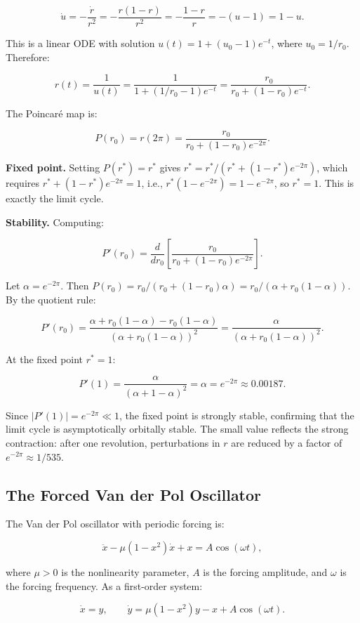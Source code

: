 \[
\dot{u} = -\frac{\dot{r}}{r^2} = -\frac{r(1-r)}{r^2} = -\frac{1-r}{r} = -(u - 1) = 1 - u.
\]

This is a linear ODE with solution $u(t) = 1 + (u_0 - 1)e^{-t}$, where $u_0 = 1/r_0$. Therefore:

\[
r(t) = \frac{1}{u(t)} = \frac{1}{1 + (1/r_0 - 1)e^{-t}} = \frac{r_0}{r_0 + (1 - r_0)e^{-t}}.
\]

The Poincaré map is:

\[
\boxed{P(r_0) = r(2\pi) = \frac{r_0}{r_0 + (1 - r_0)e^{-2\pi}}.}
\]

\textbf{Fixed point.} Setting $P(r^*) = r^*$ gives $r^* = r^*/(r^* + (1 - r^*)e^{-2\pi})$, which requires $r^* + (1 - r^*)e^{-2\pi} = 1$, i.e., $r^*(1 - e^{-2\pi}) = 1 - e^{-2\pi}$, so $r^* = 1$. This is exactly the limit cycle.

\textbf{Stability.} Computing:

\[
P'(r_0) = \frac{d}{dr_0}\left[\frac{r_0}{r_0 + (1-r_0)e^{-2\pi}}\right].
\]

Let $\alpha = e^{-2\pi}$. Then $P(r_0) = r_0 / (r_0 + (1-r_0)\alpha) = r_0 / (\alpha + r_0(1-\alpha))$. By the quotient rule:

\[
P'(r_0) = \frac{\alpha + r_0(1-\alpha) - r_0(1-\alpha)}{(\alpha + r_0(1-\alpha))^2} = \frac{\alpha}{(\alpha + r_0(1-\alpha))^2}.
\]

At the fixed point $r^* = 1$:

\[
P'(1) = \frac{\alpha}{(\alpha + 1 - \alpha)^2} = \alpha = e^{-2\pi} \approx 0.00187.
\]

Since $|P'(1)| = e^{-2\pi} \ll 1$, the fixed point is strongly stable, confirming that the limit cycle is asymptotically orbitally stable. The small value reflects the strong contraction: after one revolution, perturbations in $r$ are reduced by a factor of $e^{-2\pi} \approx 1/535$.

\subsection{The Forced Van der Pol Oscillator}\label{sec:4.3.2}

The Van der Pol oscillator with periodic forcing is:

\[
\ddot{x} - \mu(1 - x^2)\dot{x} + x = A\cos(\omega t),
\]

where $\mu > 0$ is the nonlinearity parameter, $A$ is the forcing amplitude, and $\omega$ is the forcing frequency. As a first-order system:

\[
\dot{x} = y, \qquad \dot{y} = \mu(1 - x^2)y - x + A\cos(\omega t).
\]

